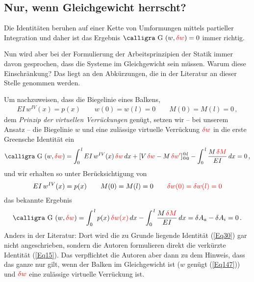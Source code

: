 {{{{{\vspace{-0.5cm}
{\textcolor{sectionTitleBlue}{\section{Nur, wenn Gleichgewicht herrscht?}}}
Die Identit\"{a}ten beruhen auf einer Kette von Umformungen mittels partieller Integration und daher ist das Ergebnis $\text{\normalfont\calligra G\,\,}(w, \textcolor{red}{\delta w}) = 0 $ immer richtig.

Nun wird aber bei der Formulierung der Arbeitsprinzipien der Statik immer davon gesprochen, dass die Systeme im Gleichgewicht sein m\"{u}ssen. Warum diese Einschr\"{a}nkung? Das liegt an den Abk\"{u}rzungen, die in der Literatur an dieser Stelle genommen werden.

Um nachzuweisen, dass die Biegelinie eines Balkens,
\begin{align}\label{Eq147}
EI\,w^{IV}(x) = p(x) \qquad w(0) = w(l) = 0 \qquad M(0) = M(l) = 0\,,
\end{align}
dem {\em Prinzip der virtuellen Verr\"{u}ckungen\/} gen\"{u}gt, setzen wir -- bei unserem Ansatz -- die Biegelinie $w$ und eine zul\"{a}ssige virtuelle Verr\"{u}ckung $\textcolor{red}{\delta w }$ in die erste Greensche Identit\"{a}t ein
\begin{align} \label{Eq30}
\text{\normalfont\calligra G\,\,}(w, \textcolor{red}{\delta w})  = \int_0^{\,l} EI\,w^{IV}(x)\,\textcolor{red}{\delta w}\,dx + [V\,\textcolor{red}{\delta w} - M\,\textcolor{red}{\delta w'}]_{@0}^{@l} - \int_0^{\,l} \frac{M\,\textcolor{red}{\delta M}}{EI}\,dx = 0\,,
\end{align}
und wir erhalten so unter Ber\"{u}cksichtigung von
\begin{align} \label{Eq16}
EI\,w^{IV}(x) = p(x) \qquad M(0) = M(l) = 0 \qquad \textcolor{red}{\delta w(0) = \delta w(l) = 0}
\end{align}
das bekannte Ergebnis
\begin{align}\label{Eq15}
\text{\normalfont\calligra G\,\,}(w,\textcolor{red}{\delta w}) = \int_0^{\,l} p(x)\,\textcolor{red}{\delta w(x)}\,dx - \int_0^{\,l} \frac{M\,\textcolor{red}{\delta M}}{EI}\,dx = {\delta A_a - \delta A_i = 0}\,.
\end{align}
Anders in der Literatur: Dort wird die zu Grunde liegende Identit\"{a}t (\ref{Eq30}) gar nicht angeschrieben, sondern die Autoren formulieren direkt die verk\"{u}rzte Identit\"{a}t (\ref{Eq15}). Das verpflichtet die Autoren aber dann zu dem Hinweis, dass das ganze nur gilt, wenn der Balken im Gleichgewicht ist ($w$ gen\"{u}gt (\ref{Eq147})) und $\textcolor{red}{\delta w} $ eine zul\"{a}ssige virtuelle Verr\"{u}ckung ist.

}}}}}
